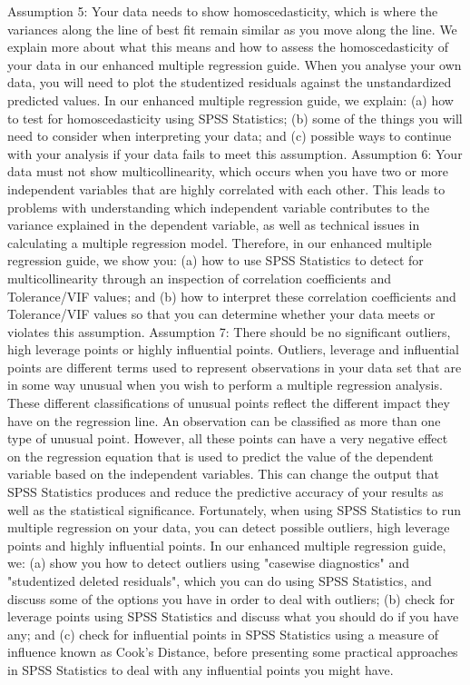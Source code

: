 \documentclass[]{article}
\begin{document}
	Assumption 5: Your data needs to show homoscedasticity, which is where the variances along the line of best fit remain similar as you move along the line. We explain more about what this means and how to assess the homoscedasticity of your data in our enhanced multiple regression guide. When you analyse your own data, you will need to plot the studentized residuals against the unstandardized predicted values. In our enhanced multiple regression guide, we explain: (a) how to test for homoscedasticity using SPSS Statistics; (b) some of the things you will need to consider when interpreting your data; and (c) possible ways to continue with your analysis if your data fails to meet this assumption.
	Assumption 6: Your data must not show multicollinearity, which occurs when you have two or more independent variables that are highly correlated with each other. This leads to problems with understanding which independent variable contributes to the variance explained in the dependent variable, as well as technical issues in calculating a multiple regression model. Therefore, in our enhanced multiple regression guide, we show you: (a) how to use SPSS Statistics to detect for multicollinearity through an inspection of correlation coefficients and Tolerance/VIF values; and (b) how to interpret these correlation coefficients and Tolerance/VIF values so that you can determine whether your data meets or violates this assumption.
	Assumption 7: There should be no significant outliers, high leverage points or highly influential points. Outliers, leverage and influential points are different terms used to represent observations in your data set that are in some way unusual when you wish to perform a multiple regression analysis. These different classifications of unusual points reflect the different impact they have on the regression line. An observation can be classified as more than one type of unusual point. However, all these points can have a very negative effect on the regression equation that is used to predict the value of the dependent variable based on the independent variables. This can change the output that SPSS Statistics produces and reduce the predictive accuracy of your results as well as the statistical significance. Fortunately, when using SPSS Statistics to run multiple regression on your data, you can detect possible outliers, high leverage points and highly influential points. In our enhanced multiple regression guide, we: (a) show you how to detect outliers using "casewise diagnostics" and "studentized deleted residuals", which you can do using SPSS Statistics, and discuss some of the options you have in order to deal with outliers; (b) check for leverage points using SPSS Statistics and discuss what you should do if you have any; and (c) check for influential points in SPSS Statistics using a measure of influence known as Cook's Distance, before presenting some practical approaches in SPSS Statistics to deal with any influential points you might have.
\end{document}
